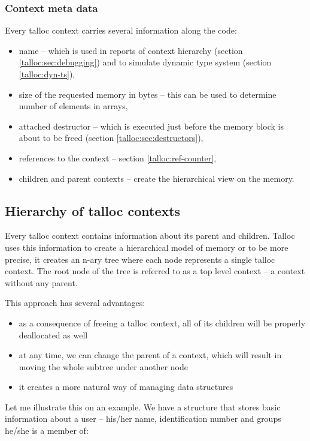 \subsubsection{Context meta data}
Every talloc context carries several information along the code:

\begin{itemize}
  \item name -- which is used in reports of context hierarchy (section
  \ref{talloc:sec:debugging}) and to simulate dynamic type system (section
  \ref{talloc:dyn-ts}),
  \item size of the requested memory in bytes -- this can be used to determine
  number of elements in arrays,
  \item attached destructor -- which is executed just before the memory block is
  about to be freed (section \ref{talloc:sec:destructors}),
  \item references to the context -- section \ref{talloc:ref-counter},
  \item children and parent contexts -- create the hierarchical view on the
  memory.
\end{itemize}

\subsection{Hierarchy of talloc contexts}

Every talloc context contains information about its parent and children. Talloc
uses this information to create a hierarchical model of memory or to be more
precise, it creates an n-ary tree where each node represents a single talloc
context. The root node of the tree is referred to as a top level context -- a
context without any parent.

This approach has several advantages:

\begin{itemize}
  \item as a consequence of freeing a talloc context, all of its children
  will be properly deallocated as well
  \item at any time, we can change the parent of a context, which
  will result in moving the whole subtree under another node
  \item it creates a more natural way of managing data structures
\end{itemize}

Let me illustrate this on an example. We have a structure that stores basic
information about a user -- his/her name, identification number and groups
he/she is a member of:

